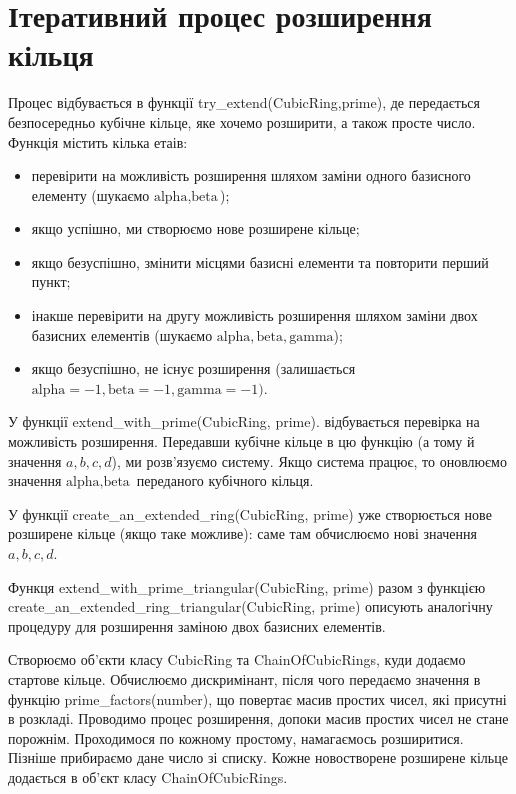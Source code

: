 \documentclass{thesis}
\begin{document}
\section{Ітеративний процес розширення кільця}\label{appendix1.2}
Процес відбувається в функції try\_extend(CubicRing,prime), де передається безпосередньо кубічне кільце, яке хочемо розширити, а також просте число. Функція містить кілька етаів:
\begin{itemize}
\item перевірити на можливість розширення шляхом заміни одного базисного елементу (шукаємо $\text{alpha},\text{beta}$);
\item якщо успішно, ми створюємо нове розширене кільце;
\item якщо безуспішно, змінити місцями базисні елементи та повторити перший пункт;
\item інакше перевірити на другу можливість розширення шляхом заміни двох базисних елементів (шукаємо $\text{alpha},\text{beta},\text{gamma}$);
\item якщо безуспішно, не існує розширення (залишається $\text{alpha} = -1, \text{beta} = -1, \text{gamma} = -1)$.
\end{itemize}
У функції extend\_with\_prime(CubicRing, prime). відбувається перевірка на можливість розширення. Передавши кубічне кільце в цю функцію (а тому й значення $a,b,c,d$), ми розв'язуємо систему. Якщо система працює, то оновлюємо значення $\text{alpha},\text{beta}$ переданого кубічного кільця.

У функції create\_an\_extended\_ring(CubicRing, prime) уже створюється нове розширене кільце (якщо таке можливе): саме там обчислюємо нові значення $a,b,c,d$.

Функця extend\_with\_prime\_triangular(CubicRing, prime) разом з функцією create\_an\_extended\_ring\_triangular(CubicRing, prime) описують аналогічну процедуру для розширення заміною двох базисних елементів.

Створюємо об'єкти класу CubicRing та ChainOfCubicRings, куди додаємо стартове кільце. Обчислюємо дискримінант, після чого передаємо значення в функцію prime\_factors(number), що повертає масив простих чисел, які присутні в розкладі. Проводимо процес розширення, допоки масив простих чисел не стане порожнім. Проходимося по кожному простому, намагаємось розширитися. Пізніше прибираємо дане число зі списку. Кожне новостворене розширене кільце додається в об'єкт класу ChainOfCubicRings.
\end{document}
